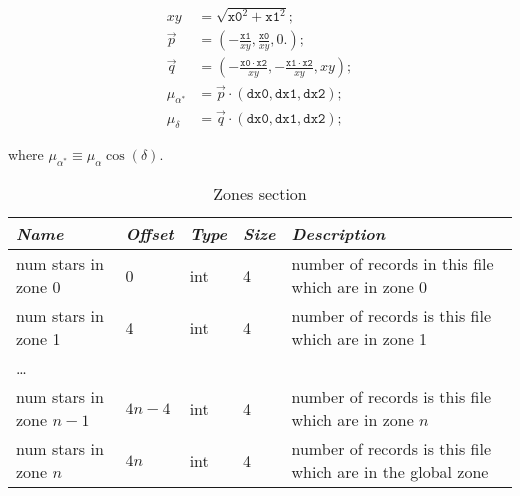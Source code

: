 \begin{equation}
\begin{aligned}
	xy &= \sqrt{\mathtt{x0}^2 + \mathtt{x1}^2}; \\
	\vec{p} &= \left(-\frac{\mathtt{x1}}{xy}, \frac{\mathtt{x0}}{xy}, 0.\right); \\
	\vec{q} &= \left(-\frac{\mathtt{x0} \cdot \mathtt{x2}}{xy}, -\frac{\mathtt{x1} \cdot \mathtt{x2}}{xy}, xy\right);\\
	\mu_{\alpha^*} &= \vec{p} \cdot \left(\mathtt{dx0}, \mathtt{dx1}, \mathtt{dx2}\right); \\
	\mu_{\delta} &= \vec{q} \cdot \left(\mathtt{dx0}, \mathtt{dx1}, \mathtt{dx2}\right);
\end{aligned}
\end{equation}

where $\mu_{\alpha^*}\equiv\mu_{\alpha}\cos{(\delta)}$.

\begin{table}[htbp]
\begin{tabularx}{\textwidth}{llllX}\toprule
\emph{Name} & \emph{Offset} & \emph{Type} & \emph{Size} &\emph{Description}\\\midrule
num stars in zone 0     & 0      & int & 4 &  number of records in this file which are in zone 0\\
num stars in zone 1     & 4      & int & 4 &  number of records is this file which are in zone 1\\
\ldots                  &        &     &   &\\
num stars in zone $n-1$ & $4n-4$ & int & 4 &  number of records is this file which are in zone $n$\\\bottomrule
num stars in zone $n$   & $4n$   & int & 4 &  number of records is this file which are in the global zone\\\bottomrule
\end{tabularx}
\caption{Zones section}
\label{tab:Catalogues:stars:record:zones}
\end{table}


